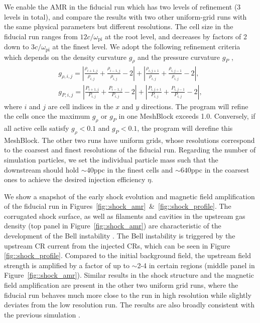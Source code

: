 \documentclass[fleqn,usenatbib]{mnras}
\begin{document}
We enable the AMR in the fiducial run which has two levels of refinement (3 levels in total), and compare the
results with two other uniform-grid runs with the same physical parameters but different resolutions. The cell size in the fiducial run ranges from $12 c/\omega_\text{pi}$ at the root level, 
and decreases by factors of 2 down to $3c/\omega_\text{pi}$ at the finest level. We adopt the following refinement criteria which depends on the density curvature $g_\rho$ and the pressure curvature $g_P$ \citep{2020ApJS..249....4S},
\begin{align*}
	g_{\rho, i, j} = |\frac{\rho_{i+1,j}}{\rho_{i,j}} + \frac{\rho_{i-1,j}}{\rho_{i,j}} - 2| + |\frac{\rho_{i,j+1}}{\rho_{i,j}} + \frac{\rho_{i,j-1}}{\rho_{i,j}} - 2|, \\
	g_{P, i, j} = |\frac{P_{i+1,j}}{P_{i,j}} + \frac{P_{i-1,j}}{P_{i,j}} - 2| + |\frac{P_{i,j+1}}{P_{i,j}} + \frac{P_{i,j-1}}{P_{i,j}} - 2|,
\end{align*}
where $i$ and $j$ are cell indices in the $x$ and $y$ directions. The program will refine the cells once the maximum $g_\rho$ or $g_P$ in one MeshBlock exceeds 1.0.
Conversely, if all active cells satisfy $g_\rho < 0.1$ and $g_P < 0.1$, the program will derefine this MeshBlock. The other two runs have uniform grids, whose resolutions correspond to
the coarsest and finest resolutions of the fiducial run. Regarding the number of simulation particles, we set the individual particle mass such that the downstream should hold $\sim 40$ppc in the finest cells and $\sim 640$ppc in the coarsest ones to achieve the desired injection efficiency $\eta$.

We show a snapshot of the early shock evolution and magnetic field amplification of the fiducial run in Figures~\ref{fig::shock_amr}~\&~\ref{fig::shock_profile}. The corrugated shock surface, as well as filaments and cavities in the upstream gas density (top panel in Figure~\ref{fig::shock_amr}) are characteristic of
the development of the Bell instability \citep{2005MNRAS.358..181B,2012MNRAS.419.2433R}.
The Bell instability is triggered by the upstream CR current from the injected CRs, which can be seen in Figure \ref{fig::shock_profile}.
Compared to the initial background field, the upstream field strength is amplified by a factor of up to $\sim$2-4 in certain regions (middle panel in Figure~\ref{fig::shock_amr}). Similar results in the shock structure and the magnetic field amplification are present in the other two uniform grid runs, where the fiducial run behaves much more close to the run in high resolution while slightly deviates from the low resolution run. The results are also broadly consistent with the previous simulation \citep[e.g. ][]{2015ApJ...809...55B, 2018ApJ...859...13M, 2018MNRAS.473.3394V}.
\end{document}
